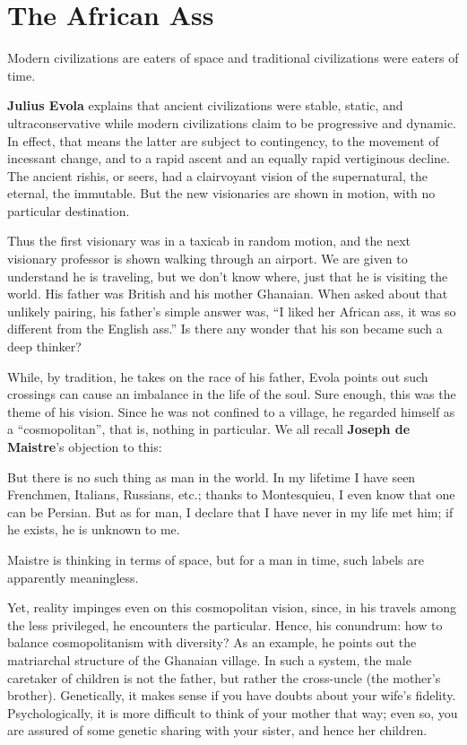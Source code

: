 \section{The African Ass}

\begin{quotex}
Modern civilizations are eaters of space and traditional civilizations were eaters of time.
\end{quotex}

\textbf{Julius Evola} explains that ancient civilizations were stable, static, and ultraconservative while modern civilizations claim to be progressive and dynamic. In effect, that means the latter are subject to contingency, to the movement of incessant change, and to a rapid ascent and an equally rapid vertiginous decline. The ancient rishis, or seers, had a clairvoyant vision of the supernatural, the eternal, the immutable. But the new visionaries are shown in motion, with no particular destination.

Thus the first visionary was in a taxicab in random motion, and the next visionary professor is shown walking through an airport. We are given to understand he is traveling, but we don't know where, just that he is visiting the world. His father was British and his mother Ghanaian. When asked about that unlikely pairing, his father's simple answer was, ``I liked her African ass, it was so different from the English ass.'' Is there any wonder that his son became such a deep thinker?

While, by tradition, he takes on the race of his father, Evola points out such crossings can cause an imbalance in the life of the soul. Sure enough, this was the theme of his vision. Since he was not confined to a village, he regarded himself as a ``cosmopolitan'', that is, nothing in particular. We all recall \textbf{Joseph de Maistre}'s objection to this:

\begin{quotex}
But there is no such thing as man in the world. In my lifetime I have seen Frenchmen, Italians, Russians, etc.; thanks to Montesquieu, I even know that one can be Persian. But as for man, I declare that I have never in my life met him; if he exists, he is unknown to me.
\end{quotex}


Maistre is thinking in terms of space, but for a man in time, such labels are apparently meaningless.

Yet, reality impinges even on this cosmopolitan vision, since, in his travels among the less privileged, he encounters the particular. Hence, his conundrum: how to balance cosmopolitanism with diversity? As an example, he points out the matriarchal structure of the Ghanaian village. In such a system, the male caretaker of children is not the father, but rather the cross-uncle (the mother's brother). Genetically, it makes sense if you have doubts about your wife's fidelity. Psychologically, it is more difficult to think of your mother that way; even so, you are assured of some genetic sharing with your sister, and hence her children.

